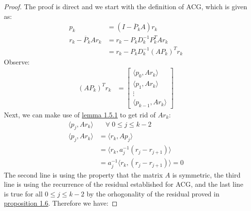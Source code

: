 \documentclass[]{article}
\theoremstyle{definition}
\begin{document}
            \begin{proof}
                The proof is direct and we start with the definition of ACG, which is given as: 
                \begin{align}
                    p_k &= (I - \overline{P}_kA)r_k
                    \\
                    r_k - \overline{P}_kAr_k &= 
                    r_k - P_kD^{-1}_kP^T_kAr_k
                    \\
                    &= r_k - P_kD^{-1}_k(AP_k)^Tr_k
                \end{align}
                Observe:
                \begin{align}
                    (AP_k)^Tr_k &= 
                    \begin{bmatrix}
                        \langle p_0, Ar_k\rangle
                        \\
                        \langle p_1, Ar_k\rangle
                        \\
                        \vdots
                        \\
                        \langle p_{k - 1}, Ar_k\rangle
                    \end{bmatrix}
                \end{align}
                Next, we can make use of \hyperref[lemma:1.5.1]{lemma 1.5.1} to get rid of $Ar_k$: 
                \begin{align}
                    \langle p_j, Ar_k\rangle& \quad \forall\; 0 \le j \le k -2 
                    \\
                    \langle p_j, Ar_k\rangle&= \langle r_k, Ap_j\rangle
                    \\
                    &= \langle r_k, a_j^{-1}(r_j - r_{j + 1})\rangle
                    \\
                    &= a_j^{-1}\langle r_k, (r_j - r_{j + 1})\rangle = 0
                \end{align}
                The second line is using the property that the matrix $A$ is symmetric, the third line is using the recurrence of the residual established for ACG, and the last line is true for all $0 \le j \le k - 2$ by the orhogonality of the residual proved in \hyperref[prop:1.6]{proposition 1.6}. Therefore we have: 
                

\end{proof}
\end{document}

